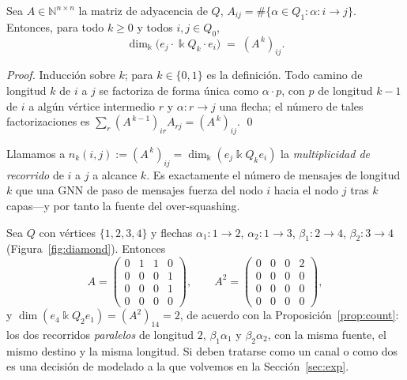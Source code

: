 \documentclass[runningheads]{llncs}
\newcommand{\kk}{\Bbbk}
\newcommand{\kQ}{\kk Q}
\newcommand{\NN}{\mathbb{N}}
\newcommand{\Adj}{A}
\begin{document}
\begin{proposition}\label{prop:count}
Sea $\Adj\in\NN^{n\times n}$ la matriz de adyacencia de $Q$,
$\Adj_{ij}=\#\{\alpha\in Q_1:\alpha\colon i\to j\}$. Entonces, para todo
$k\ge0$ y todos $i,j\in Q_0$,
\[
  \dim_{\kk}\bigl(e_j\cdot \kQ_k\cdot e_i\bigr) \;=\; (\Adj^{\,k})_{ij}.
\]
\end{proposition}

\begin{proof}
Inducción sobre $k$; para $k\in\{0,1\}$ es la definición. Todo camino de
longitud $k$ de $i$ a $j$ se factoriza de forma única como $\alpha\cdot p$, con
$p$ de longitud $k-1$ de $i$ a algún vértice intermedio $r$ y
$\alpha\colon r\to j$ una flecha; el número de tales factorizaciones es
$\sum_r(\Adj^{\,k-1})_{ir}\Adj_{rj}=(\Adj^{\,k})_{ij}$. \qed
\end{proof}

Llamamos a $n_k(i,j):=(\Adj^{\,k})_{ij}=\dim_\kk(e_j\kQ_k e_i)$ la
\emph{multiplicidad de recorrido} de $i$ a $j$ a alcance $k$. Es exactamente el
número de mensajes de longitud $k$ que una GNN de paso de mensajes fuerza del
nodo $i$ hacia el nodo $j$ tras $k$ capas---y por tanto la fuente del
over-squashing.

\begin{example}\label{ex:diamond}
Sea $Q$ con vértices $\{1,2,3,4\}$ y flechas $\alpha_1\colon1\to2$,
$\alpha_2\colon1\to3$, $\beta_1\colon2\to4$, $\beta_2\colon3\to4$
(Figura~\ref{fig:diamond}). Entonces
\[
  \Adj=\begin{pmatrix}0&1&1&0\\0&0&0&1\\0&0&0&1\\0&0&0&0\end{pmatrix},
  \qquad
  \Adj^2=\begin{pmatrix}0&0&0&2\\0&0&0&0\\0&0&0&0\\0&0&0&0\end{pmatrix},
\]
y $\dim(e_4\kQ_2e_1)=(\Adj^2)_{14}=2$, de acuerdo con la
Proposición~\ref{prop:count}: los dos recorridos \emph{paralelos} de longitud
$2$, $\beta_1\alpha_1$ y $\beta_2\alpha_2$, con la misma fuente, el mismo
destino y la misma longitud. Si deben tratarse como un canal o como dos es una
decisión de modelado a la que volvemos en la Sección~\ref{sec:exp}.
\end{example}
\end{document}
